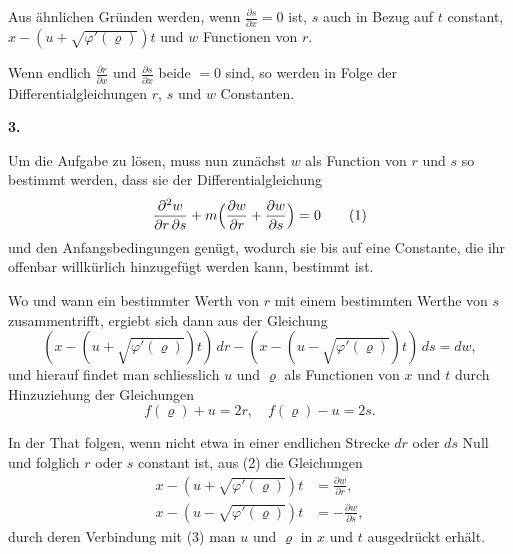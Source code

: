 \documentclass[12pt,a4paper]{book}
\theoremstyle{definition}
\theoremstyle{remark}
\begin{document}
Aus \"ahnlichen Gr\"unden werden, wenn $\frac{\partial s}{\partial x} = 0$ ist, $s$ auch in Bezug auf $t$ constant, $x - (u + \sqrt{\varphi'(\varrho)})t$ und $w$ Functionen von $r$.

Wenn endlich $\frac{\partial r}{\partial x}$ und $\frac{\partial s}{\partial x}$ beide $= 0$ sind, so werden in Folge der Differentialgleichungen $r$, $s$ und $w$ Constanten.

\newpage
\begin{center}
\textbf{3.}
\end{center}

Um die Aufgabe zu l\"osen, muss nun zun\"achst $w$ als Function von $r$ und $s$ so bestimmt werden, dass sie der Differentialgleichung
\begin{equation*}
\frac{\partial^{2}w}{\partial r\,\partial s} + m\Bigl(\frac{\partial w}{\partial r} + \frac{\partial w}{\partial s}\Bigr) = 0\tag{1}
\end{equation*}
und den Anfangsbedingungen gen\"ugt, wodurch sie bis auf eine Constante, die ihr offenbar willk\"urlich hinzugef\"ugt werden kann, bestimmt ist.

Wo und wann ein bestimmter Werth von $r$ mit einem bestimmten Werthe von $s$ zusammentrifft, ergiebt sich dann aus der Gleichung
\begin{equation*}
(x - (u + \sqrt{\varphi'(\varrho)})t)\,dr - (x - (u - \sqrt{\varphi'(\varrho)})t)\,ds = dw,\tag{2}
\end{equation*}
und hierauf findet man schliesslich $u$ und $\varrho$ als Functionen von $x$ und $t$ durch Hinzuziehung der Gleichungen
\begin{equation*}
f(\varrho) + u = 2r,\quad f(\varrho) - u = 2s.\tag{3}
\end{equation*}

In der That folgen, wenn nicht etwa in einer endlichen Strecke $dr$ oder $ds$ Null und folglich $r$ oder $s$ constant ist, aus (2) die Gleichungen
\begin{align*}
x - (u + \sqrt{\varphi'(\varrho)})t &= \frac{\partial w}{\partial r},\\
x - (u - \sqrt{\varphi'(\varrho)})t &= -\frac{\partial w}{\partial s},\tag{4,5}
\end{align*}
durch deren Verbindung mit (3) man $u$ und $\varrho$ in $x$ und $t$ ausgedr\"uckt erh\"alt.
\end{document}

